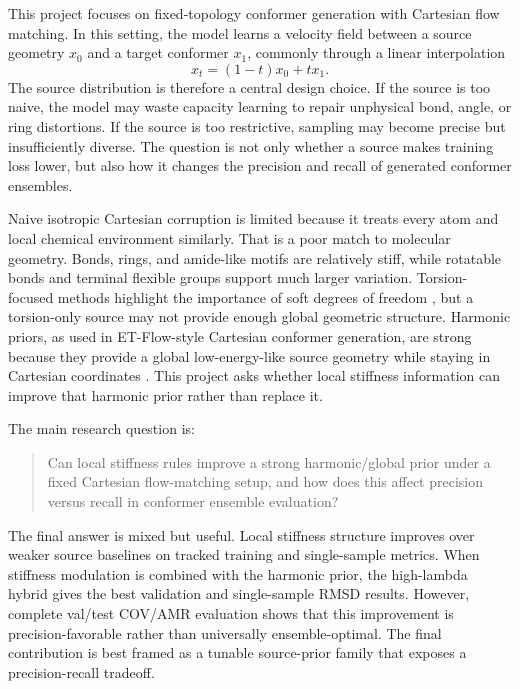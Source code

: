 \documentclass[11pt]{article}
\begin{document}
This project focuses on fixed-topology conformer generation with Cartesian flow matching. In this setting, the model learns a velocity field between a source geometry $x_0$ and a target conformer $x_1$, commonly through a linear interpolation
\begin{equation}
    x_t = (1-t)x_0 + t x_1 .
\end{equation}
The source distribution is therefore a central design choice. If the source is too naive, the model may waste capacity learning to repair unphysical bond, angle, or ring distortions. If the source is too restrictive, sampling may become precise but insufficiently diverse. The question is not only whether a source makes training loss lower, but also how it changes the precision and recall of generated conformer ensembles.

Naive isotropic Cartesian corruption is limited because it treats every atom and local chemical environment similarly. That is a poor match to molecular geometry. Bonds, rings, and amide-like motifs are relatively stiff, while rotatable bonds and terminal flexible groups support much larger variation. Torsion-focused methods highlight the importance of soft degrees of freedom \cite{torsionaldiffusion}, but a torsion-only source may not provide enough global geometric structure. Harmonic priors, as used in ET-Flow-style Cartesian conformer generation, are strong because they provide a global low-energy-like source geometry while staying in Cartesian coordinates \cite{etflow}. This project asks whether local stiffness information can improve that harmonic prior rather than replace it.

The main research question is:

\begin{quote}
Can local stiffness rules improve a strong harmonic/global prior under a fixed Cartesian flow-matching setup, and how does this affect precision versus recall in conformer ensemble evaluation?
\end{quote}

The final answer is mixed but useful. Local stiffness structure improves over weaker source baselines on tracked training and single-sample metrics. When stiffness modulation is combined with the harmonic prior, the high-lambda hybrid gives the best validation and single-sample RMSD results. However, complete val/test COV/AMR evaluation shows that this improvement is precision-favorable rather than universally ensemble-optimal. The final contribution is best framed as a tunable source-prior family that exposes a precision-recall tradeoff.
\end{document}
